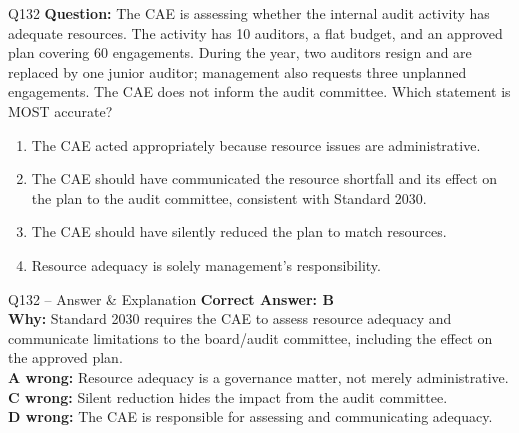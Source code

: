 \documentclass[aspectratio=169,10pt]{beamer}
\begin{document}
	\begin{frame}[t]{Q132}
		\small
		\textbf{Question:} The CAE is assessing whether the internal audit activity has adequate resources. The activity has 10 auditors, a flat budget, and an approved plan covering 60 engagements. During the year, two auditors resign and are replaced by one junior auditor; management also requests three unplanned engagements. The CAE does not inform the audit committee. Which statement is MOST accurate?
		\begin{enumerate}[label=\Alph*.,itemsep=1pt,topsep=2pt]
			\item The CAE acted appropriately because resource issues are administrative.
			\item The CAE should have communicated the resource shortfall and its effect on the plan to the audit committee, consistent with Standard 2030.
			\item The CAE should have silently reduced the plan to match resources.
			\item Resource adequacy is solely management's responsibility.
		\end{enumerate}
	\end{frame}
	
	\begin{frame}[t]{Q132 -- Answer \& Explanation}
		\small
		\textbf{Correct Answer: B} \\[4pt]
		\textbf{Why:} Standard 2030 requires the CAE to assess resource adequacy and communicate limitations to the board/audit committee, including the effect on the approved plan. \\[4pt]
		\textbf{A wrong:} Resource adequacy is a governance matter, not merely administrative. \\[2pt]
		\textbf{C wrong:} Silent reduction hides the impact from the audit committee. \\[2pt]
		\textbf{D wrong:} The CAE is responsible for assessing and communicating adequacy.
	\end{frame}
	
\end{document}
